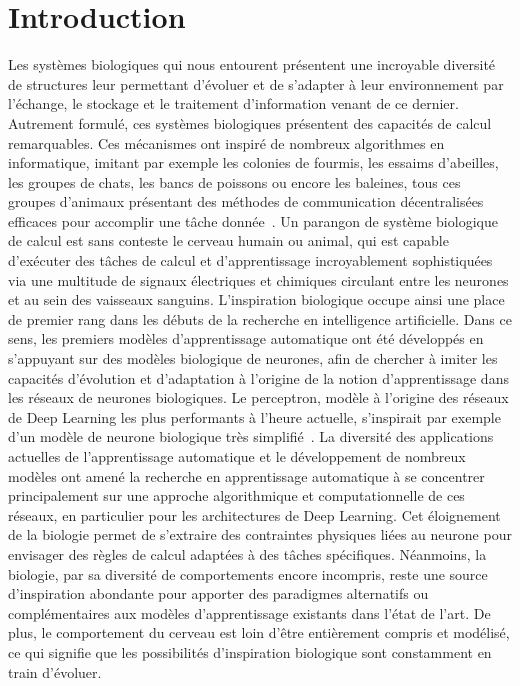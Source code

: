 \chapter*{Introduction}

Les systèmes biologiques qui nous entourent présentent une incroyable diversité de structures leur permettant d'évoluer et de s'adapter à leur environnement par l'échange, le stockage et le traitement d'information venant de ce dernier.
Autrement formulé, ces systèmes biologiques présentent des capacités de calcul remarquables. Ces mécanismes ont inspiré de nombreux algorithmes en informatique, imitant par exemple les colonies de fourmis, les essaims d'abeilles, les groupes de chats, les bancs de poissons ou encore les baleines, tous ces groupes d'animaux présentant des méthodes de communication décentralisées efficaces pour accomplir une tâche donnée~\parencite{Darwish2018BioinspiredCA}.
Un parangon de système biologique de calcul est sans conteste le cerveau humain ou animal, qui est capable d'exécuter des tâches de calcul et d'apprentissage incroyablement sophistiquées via une multitude de signaux électriques et chimiques circulant entre les neurones et au sein des vaisseaux sanguins.
L'inspiration biologique occupe ainsi une place de premier rang dans les débuts de la recherche en intelligence artificielle. Dans ce sens, les premiers modèles d'apprentissage automatique ont été développés en s'appuyant sur des modèles biologique de neurones, afin de chercher à imiter les capacités d'évolution et d'adaptation à l'origine de la notion d'apprentissage dans les réseaux de neurones biologiques. Le perceptron, modèle à l'origine des réseaux de Deep Learning les plus performants à l'heure actuelle, s'inspirait par exemple d'un modèle de neurone biologique très simplifié~\parencite{McCulloch1990ALC}.
La diversité des applications actuelles de l'apprentissage automatique et le développement de nombreux modèles ont amené la recherche en apprentissage automatique à se concentrer principalement sur une approche algorithmique et computationnelle de ces réseaux, en particulier pour les architectures de Deep Learning. Cet éloignement de la biologie permet de s'extraire des contraintes physiques liées au neurone pour envisager des règles de calcul adaptées à des tâches spécifiques.
Néanmoins, la biologie, par sa diversité de comportements encore incompris, reste une source d'inspiration abondante pour apporter des paradigmes alternatifs ou complémentaires aux modèles d'apprentissage existants dans l'état de l'art. De plus, le comportement du cerveau est loin d'être entièrement compris et modélisé, ce qui signifie que les possibilités d'inspiration biologique sont constamment en train d'évoluer.
